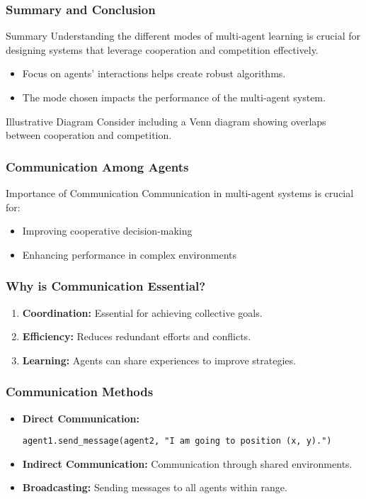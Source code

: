 \documentclass[aspectratio=169]{beamer}
\begin{document}
\begin{frame}[fragile]
    \frametitle{Summary and Conclusion}
    \begin{block}{Summary}
        Understanding the different modes of multi-agent learning is crucial for designing systems that leverage cooperation and competition effectively.
    \end{block}
    \begin{itemize}
        \item Focus on agents' interactions helps create robust algorithms.
        \item The mode chosen impacts the performance of the multi-agent system.
    \end{itemize}
    \begin{block}{Illustrative Diagram}
        Consider including a Venn diagram showing overlaps between cooperation and competition.
    \end{block}
\end{frame}

\begin{frame}[fragile]
    \frametitle{Communication Among Agents}
    \begin{block}{Importance of Communication}
        Communication in multi-agent systems is crucial for:
        \begin{itemize}
            \item Improving cooperative decision-making
            \item Enhancing performance in complex environments
        \end{itemize}
    \end{block}
\end{frame}

\begin{frame}[fragile]
    \frametitle{Why is Communication Essential?}
    \begin{enumerate}
        \item \textbf{Coordination:} Essential for achieving collective goals.
        \item \textbf{Efficiency:} Reduces redundant efforts and conflicts.
        \item \textbf{Learning:} Agents can share experiences to improve strategies.
    \end{enumerate}
\end{frame}

\begin{frame}[fragile]
    \frametitle{Communication Methods}
    \begin{itemize}
        \item \textbf{Direct Communication:} 
        \begin{lstlisting}
agent1.send_message(agent2, "I am going to position (x, y).")
        \end{lstlisting}
        
        \item \textbf{Indirect Communication:} Communication through shared environments.
        \item \textbf{Broadcasting:} Sending messages to all agents within range.
    \end{itemize}
\end{frame}
\end{document}
